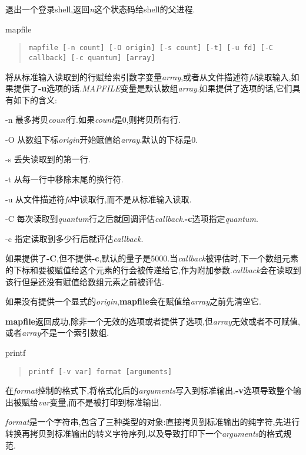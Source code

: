 \documentclass[draft,openany]{book}
\begin{document}
\begin{CJK}{UTF8}{gbsn}
\begin{basedescript}{\desclabelstyle{\nextlinelabel}\desclabelwidth{2.5em}}
        退出一个登录shell,返回\emph{n}这个状态码给shell的父进程.
    \item[mapfile]
        \begin{quote}
            \verb+mapfile [-n count] [-O origin] [-s count] [-t] [-u fd] [-C callback] [-c quantum] [array]+
        \end{quote}
        将从标准输入读取到的行赋给索引数字变量\emph{array},或者从文件描述符\emph{fd}读取输入,如果提供了\textbf{-u}选项的话.\emph{MAPFILE}变量是默认数组\emph{array}.如果提供了选项的话,它们具有如下的含义:
        \begin{basedescript}{\desclabelstyle{\nextlinelabel}\desclabelwidth{2.5em}}
        \item[-n] 最多拷贝\emph{count}行.如果\emph{count}是0,则拷贝所有行.
        \item[-O] 从数组下标\emph{origin}开始赋值给\emph{array}.默认的下标是0.
        \item[-s] 丢失读取到的第一行.
        \item[-t] 从每一行中移除末尾的换行符.
        \item[-u] 从文件描述符\emph{fd}中读取行,而不是从标准输入读取.
        \item[-C] 每次读取到\emph{quantum}行之后就回调评估\emph{callback}.\textbf{-c}选项指定\emph{quantum}.
        \item[-c] 指定读取到多少行后就评估\emph{callback}.
        \end{basedescript}
        如果提供了\textbf{-C},但不提供\textbf{-c},默认的量子是5000.当\emph{callback}被评估时,下一个数组元素的下标和要被赋值给这个元素的行会被传递给它,作为附加参数.\emph{callback}会在读取到该行但是还没有赋值给数组元素之前被评估.\par
        如果没有提供一个显式的\emph{origin},\textbf{mapfile}会在赋值给\emph{array}之前先清空它.\par
        \textbf{mapfile}返回成功,除非一个无效的选项或者提供了选项,但\emph{array}无效或者不可赋值,或者\emph{array}不是一个索引数组.
    \item[printf]
        \begin{quote}
            \verb+printf [-v var] format [arguments]+
        \end{quote}
        在\emph{format}控制的格式下,将格式化后的\emph{arguments}写入到标准输出.\textbf{-v}选项导致整个输出被赋给\emph{var}变量,而不是被打印到标准输出.\par
        \emph{format}是一个字符串,包含了三种类型的对象:直接拷贝到标准输出的纯字符,先进行转换再拷贝到标准输出的转义字符序列,以及导致打印下一个\emph{arguments}的格式规范.\par

\end{basedescript}
\end{CJK}
\end{document}
